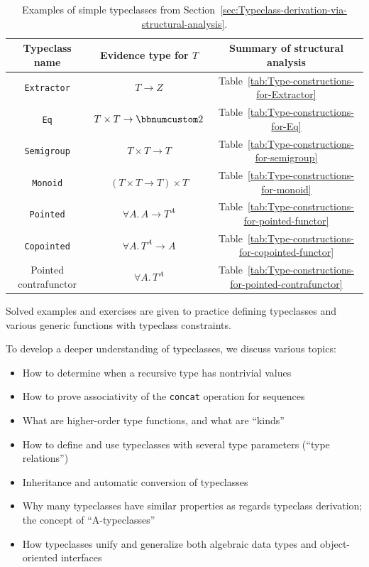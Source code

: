 \begin{table}
\begin{centering}
\begin{tabular}{|c|c|c|}
\hline 
\textbf{\small{}Typeclass name} & \textbf{\small{}Evidence type for $T$} & \textbf{\small{}Summary of structural analysis}\tabularnewline
\hline 
\hline 
{\small{}}\lstinline!Extractor! & {\small{}$T\rightarrow Z$} & {\small{}Table~\ref{tab:Type-constructions-for-Extractor}}\tabularnewline
\hline 
{\small{}}\lstinline!Eq! & {\small{}$T\times T\rightarrow\bbnum 2$} & {\small{}Table~\ref{tab:Type-constructions-for-Eq}}\tabularnewline
\hline 
{\small{}}\lstinline!Semigroup! & {\small{}$T\times T\rightarrow T$} & {\small{}Table~\ref{tab:Type-constructions-for-semigroup}}\tabularnewline
\hline 
{\small{}}\lstinline!Monoid! & {\small{}$(T\times T\rightarrow T)\times T$} & {\small{}Table~\ref{tab:Type-constructions-for-monoid}}\tabularnewline
\hline 
{\small{}}\lstinline!Pointed! & {\small{}$\forall A.\,A\rightarrow T^{A}$} & {\small{}Table~\ref{tab:Type-constructions-for-pointed-functor}}\tabularnewline
\hline 
{\small{}}\lstinline!Copointed! & {\small{}$\forall A.\,T^{A}\rightarrow A$} & {\small{}Table~\ref{tab:Type-constructions-for-copointed-functor}}\tabularnewline
\hline 
{\small{}Pointed contrafunctor} & {\small{}$\forall A.\,T^{A}$} & {\small{}Table~\ref{tab:Type-constructions-for-pointed-contrafunctor}}\tabularnewline
\hline 
\end{tabular}
\par\end{centering}
\caption{\label{tab:Examples-of-simple-typeclasses}Examples of simple typeclasses
from Section~\ref{sec:Typeclass-derivation-via-structural-analysis}.}
\end{table}

Solved examples and exercises are given to practice defining typeclasses
and various generic functions with typeclass constraints.

To develop a deeper understanding of typeclasses, we discuss various
topics: 
\begin{itemize}
\item How to determine when a recursive type has nontrivial values
\item How to prove associativity of the \lstinline!concat! operation for
sequences
\item What are higher-order type functions, and what are \textsf{``}kinds\textsf{''}
\item How to define and use typeclasses with several type parameters (\textsf{``}type
relations\textsf{''})
\item Inheritance and automatic conversion of typeclasses
\item Why many typeclasses have similar properties as regards typeclass
derivation; the concept of \textsf{``}A-typeclasses\textsf{''}
\item How typeclasses unify and generalize both algebraic data types and
object-oriented interfaces
\end{itemize}

